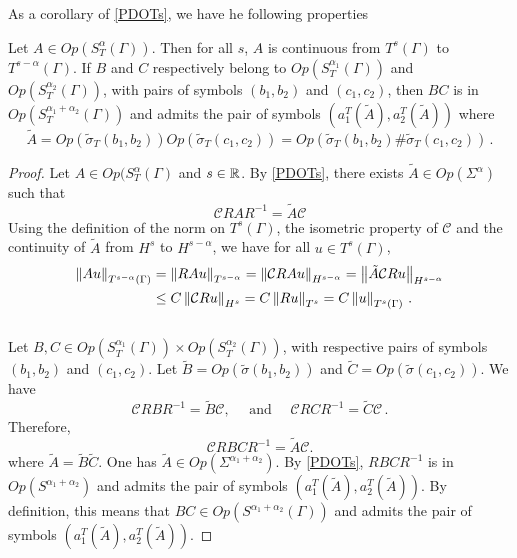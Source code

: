 \documentclass[a4paper]{article}
\begin{document}
\noindent As a corollary of \autoref{PDOTs}, we have he following properties
\begin{Cor}
	\label{CorContinuitePDOTs}
	Let $A \in \textit{Op}(S^\alpha_T(\Gamma))$. Then for all $s$, $A$ is continuous from $T^s(\Gamma)$ to $T^{s - \alpha}(\Gamma)$. If $B$ and $C$ respectively belong to $\textit{Op}(S^{\alpha_1}_T(\Gamma))$ and $\textit{Op}(S^{\alpha_2}_T(\Gamma))$, with pairs of symbols $(b_1,b_2)$ and $(c_1,c_2)$, then $BC$ is in $\textit{Op}(S^{\alpha_1 + \alpha_2}_T(\Gamma))$ and admits the pair of symbols $(a_1^T(\tilde{A}),a_2^T(\tilde{A}))$ where
	\[\tilde{A} = \textit{Op}(\tilde{\sigma}_T(b_1,b_2)) \textit{Op}(\tilde{\sigma}_T(c_1,c_2)) = \textit{Op}(\tilde{\sigma}_T(b_1,b_2)\#\tilde{\sigma}_T(c_1,c_2))\,.\]
\end{Cor}
\begin{proof}
	Let $A \in \textit{Op}(S^\alpha_T(\Gamma)$ and $s \in \mathbb{R}$. By \autoref{PDOTs}, there exists $\tilde{A} \in \textit{Op}(\Sigma^\alpha)$ such that 
	\[\mathcal{C}RAR^{-1} = \tilde{A}\mathcal{C}\]
	Using the definition of the norm on $T^s(\Gamma)$, the isometric property of $\mathcal{C}$ and the continuity of $\tilde{A}$ from $H^s$ to $H^{s - \alpha}$, we have for all $u \in T^s(\Gamma)$,  
	\[\begin{split}
	\left\|Au\right\|_{T^{s-\alpha}(\Gamma)} &= \left\|RA u\right\|_{T^{s-\alpha}}
	=\left\|\mathcal{C}RA u\right\|_{H^{s-\alpha}}
	=\left\|\tilde{A}\mathcal{C}Ru\right\|_{H^{s-\alpha}}\\
	&\leq C \left\|\mathcal{C}Ru\right\|_{H^s} = C\left\|Ru\right\|_{T^s} = C\left\|u\right\|_{T^s(\Gamma)}\,.
	\end{split}\]
	\\
	Let $B,C \in \textit{Op}(S^{\alpha_1}_T(\Gamma))\times\textit{Op}(S^{\alpha_2}_T(\Gamma))$, with respective pairs of symbols $(b_1,b_2)$ and $(c_1,c_2)$. Let $\tilde{B} = \textit{Op}(\tilde{\sigma}{(b_1,b_2)})$ and $\tilde{C} = \textit{Op}(\tilde{\sigma}{(c_1,c_2)})$. We have 
	\[\mathcal{C} RBR^{-1} = \tilde{B} \mathcal{C}, \quad \text{ and } \quad  \mathcal{C} RCR^{-1} = \tilde{C} \mathcal{C}\,.\]
	Therefore, 
	\[\mathcal{C} RBCR^{-1} = \tilde{A} \mathcal{C}.\]
	where $\tilde{A} = \tilde{B}\tilde{C}$. One has $\tilde{A} \in \textit{Op}(\Sigma^{\alpha_1 + \alpha_2})$. By \autoref{PDOTs}, $RBCR^{-1}$ is in $\textit{Op}(S^{\alpha_1 + \alpha_2})$ and admits the pair of symbols $(a_1^T(\tilde{A}),a_2^T(\tilde{A}))$. By definition, this means that $BC \in \textit{Op}(S^{\alpha_1 + \alpha_2}(\Gamma))$ and admits the pair of symbols $(a_1^T(\tilde{A}),a_2^T(\tilde{A}))$. 
\end{proof}
\end{document}
